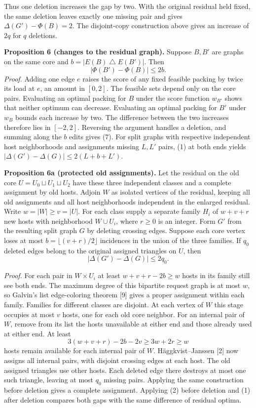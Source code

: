 \documentclass[english,11pt,a4paper]{article}
\begin{document}
Thus one deletion increases the gap by two. With the original residual held fixed, the same deletion leaves exactly one missing pair and gives \(\Delta(G')-\Phi(B)=2\). The disjoint-copy construction above gives an increase of \(2q\) for \(q\) deletions.

\textbf{Proposition 6 (changes to the residual graph).} Suppose \(B,B'\) are graphs on the same core and \(b=|E(B)\mathbin{\triangle} E(B')|\). Then \[
|\Phi(B')-\Phi(B)|\le 2b. \tag{7}
\] \emph{Proof.} Adding one edge \(e\) raises the score of any fixed feasible packing by twice its load at \(e\), an amount in \([0,2]\). The feasible sets depend only on the core pairs. Evaluating an optimal packing for \(B\) under the score function \(w_{B'}\) shows that neither optimum can decrease. Evaluating an optimal packing for \(B'\) under \(w_B\) bounds each increase by two. The difference between the two increases therefore lies in \([-2,2]\). Reversing the argument handles a deletion, and summing along the \(b\) edits gives (7). For split graphs with respective independent host neighborhoods and assignments missing \(L,L'\) pairs, (1) at both ends yields \(|\Delta(G')-\Delta(G)|\le 2(L+b+L')\).

\textbf{Proposition 6a (protected old assignments).} Let the residual on the old core \(U=U_0\sqcup U_1\sqcup U_2\) have these three independent classes and a complete assignment by old hosts. Adjoin \(W\) as isolated vertices of the residual, keeping all old assignments and all host neighborhoods independent in the enlarged residual. Write \(w=|W|\ge v=|U|\). For each class supply a separate family \(H_i\) of \(w+v+r\) new hosts with neighborhood \(W\cup U_i\), where \(r\ge0\) is an integer. Form \(G'\) from the resulting split graph \(G\) by deleting crossing edges. Suppose each core vertex loses at most \(b=\lfloor(v+r)/2\rfloor\) incidences in the union of the three families. If \(q_0\) deleted edges belong to the original assigned triangles on \(U\), then \[
|\Delta(G')-\Delta(G)|\le 2q_0.
\]

\emph{Proof.} For each pair in \(W\times U_i\) at least \(w+v+r-2b\ge w\) hosts in its family still see both ends. The maximum degree of this bipartite request graph is at most \(w\), so Galvin's list edge-coloring theorem {[}9{]} gives a proper assignment within each family. Families for different classes are disjoint. At each vertex of \(W\) this stage occupies at most \(v\) hosts, one for each old core neighbor. For an internal pair of \(W\), remove from its list the hosts unavailable at either end and those already used at either end. At least \[
3(w+v+r)-2b-2v\ge 3w+2r\ge w
\] hosts remain available for each internal pair of \(W\). Häggkvist--Janssen {[}2{]} now assigns all internal pairs, with disjoint crossing edges at each host. The old assigned triangles use other hosts. Each deleted edge there destroys at most one such triangle, leaving at most \(q_0\) missing pairs. Applying the same construction before deletion gives a complete assignment. Applying (2) before deletion and (1) after deletion compares both gaps with the same difference of residual optima.
\end{document}
